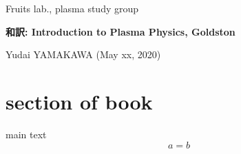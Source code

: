 \documentclass[a4j,10pt,dvipdfmx]{jsarticle}
\begin{document}
%
%
%
\noindent
{\footnotesize
Fruits lab., plasma study group    %
}

\noindent
	\textbf{\Large
		和訳: Introduction to Plasma Physics, Goldston    %
	}

	\vspace{1ex}

\noindent
	\textrm{\small 
		Yudai YAMAKAWA (May xx, 2020)    %
	}



\vspace{4ex}


\section{section of book}
%
main text
\begin{equation}
    a=b
\end{equation}
%
\end{document}
